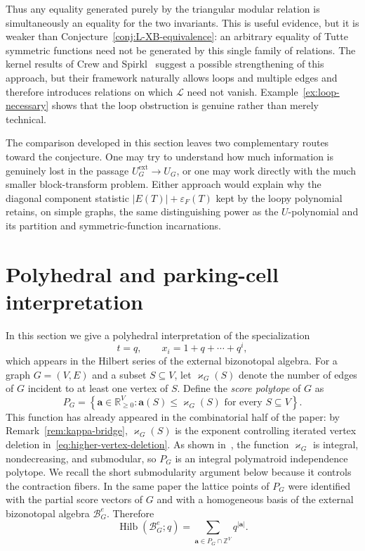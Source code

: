 \documentclass[11pt]{article}
\theoremstyle{plain}
\theoremstyle{definition}
\renewcommand{\mathcal}{\mathscr}
\newcommand{\LL}{\mathcal{L}}    %
\newcommand{\BZ}{\mathcal{B}}    %
\newcommand{\ba}{\mathbf{a}}
\newcommand{\Hil}{\operatorname{Hilb}}
\newcommand{\eps}{\varepsilon}
\newcommand{\kp}{\varkappa}
\newcommand{\ext}{\mathrm{ext}}
\newcommand{\ZZ}{\mathbb Z}
\newcommand{\RR}{\mathbb R}
\numberwithin{equation}{section}
\begin{document}
Thus any equality generated purely by the triangular modular relation is simultaneously an
equality for the two invariants.  This is useful evidence,
but it is weaker than Conjecture~\ref{conj:L-XB-equivalence}:
an arbitrary equality of Tutte symmetric functions need not be generated by this single
family of relations.
The kernel results of Crew and Spirkl~\cite{CS} suggest
a possible strengthening of this approach, but their framework naturally
allows loops and multiple edges and therefore introduces relations on which
$\LL$ need not vanish.  Example~\ref{ex:loop-necessary} shows that the loop
obstruction is genuine rather than merely technical.

The comparison developed in this section leaves two complementary routes toward the conjecture.
One may try to understand how much information is genuinely lost in the passage
$U_G^{\ext}\to U_G$, or one may work directly with the much smaller block-transform problem.
Either approach would explain why the diagonal component statistic $|E(T)|+\eps_F(T)$
kept by the loopy polynomial retains, on simple graphs, the same distinguishing
power as the $U$-polynomial and its partition and symmetric-function incarnations.


\section{Polyhedral and parking-cell interpretation}\label{sec:polyhedral}

In this section we give a polyhedral interpretation of the specialization
\[
   t=q,\qquad x_i=1+q+\cdots+q^i,
\]
which appears in the Hilbert series of the external bizonotopal algebra.
For a graph $G=(V,E)$ and a subset $S\subseteq V$, let $\kp_G(S)$ denote the number of edges
of $G$ incident to at least one vertex of $S$.  Define the \emph{score polytope} of $G$ as
\begin{equation}\label{eq:score-polytope}
P_G = \left\{\ba\in\RR_{\ge 0}^{V}:
      \ba(S)\le \kp_G(S)  \text{ for every }S\subseteq V \right\}.
\end{equation}
This function has already appeared in the combinatorial half of the paper: by
Remark~\ref{rem:kappa-bridge}, $\kp_G(S)$ is the exponent controlling
iterated vertex deletion in~\eqref{eq:higher-vertex-deletion}.
As shown in~\cite{KNSV}, the function $\kp_G$ is integral, nondecreasing, and submodular,
so $P_G$ is an integral polymatroid independence polytope. We recall the short submodularity argument below
because it controls the contraction fibers.
In the same paper the lattice points of $P_G$ were identified with the partial score vectors of $G$
and with a homogeneous basis of the external bizonotopal algebra $\BZ_G^e$. Therefore
\begin{equation}\label{eq:bizonotopal-lattice-enumerator}
   \Hil(\BZ_G^e;q)  = \sum_{\ba\in P_G\cap\ZZ^V}q^{|\ba|}.
\end{equation}
\end{document}
